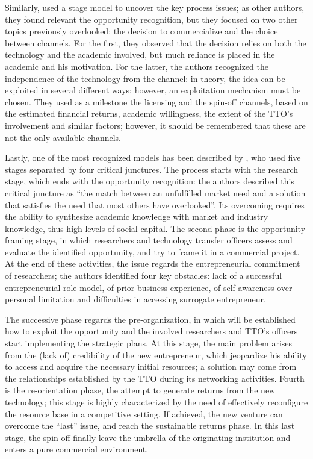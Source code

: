 Similarly, \citet{Lockett2005} used a stage model to uncover the key process issues; as other authors, they found relevant the opportunity recognition, but they focused on two other topics previously overlooked: the decision to commercialize and the choice between channels. For the first, they observed that the decision relies on both the technology and the academic involved, but much reliance is placed in the academic and his motivation. For the latter, the authors recognized the independence of the technology from the channel: in theory, the idea can be exploited in several different ways; however, an exploitation mechanism must be chosen. They used as a milestone the licensing and the spin-off channels, based on the estimated financial returns, academic willingness, the extent of the TTO's involvement and similar factors; however, it should be remembered that these are not the only available channels.

Lastly, one of the most recognized models has been described by \citet{Vohora2004}, who used five stages separated by four critical junctures. The process starts with the research stage, which ends with the opportunity recognition: the authors described this critical juncture as \enquote{the match between an unfulfilled market need and a solution that satisfies the need that most others have overlooked}. Its overcoming requires the ability to synthesize academic knowledge with market and industry knowledge, thus high levels of social capital. The second phase is the opportunity framing stage, in which researchers and technology transfer officers assess and evaluate the identified opportunity, and try to frame it in a commercial project. At the end of these activities, the issue regards the entrepreneurial commitment of researchers; the authors identified four key obstacles: lack of a successful entrepreneurial role model, of prior business experience, of self-awareness over personal limitation and difficulties in accessing surrogate entrepreneur. 

The successive phase regards the pre-organization, in which will be established how to exploit the opportunity and the involved researchers and TTO's officers start implementing the strategic plans. At this stage, the main problem arises from the (lack of) credibility of the new entrepreneur, which jeopardize his ability to access and acquire the necessary initial resources; a solution may come from the relationships established by the TTO during its networking activities. Fourth is the re-orientation phase, the attempt to generate returns from the new technology; this stage is highly characterized by the need of effectively reconfigure the resource base in a competitive setting. If achieved, the new venture can overcome the \enquote{last} issue, and reach the sustainable returns phase. In this last stage, the spin-off finally leave the umbrella of the originating institution and enters a pure commercial environment.

